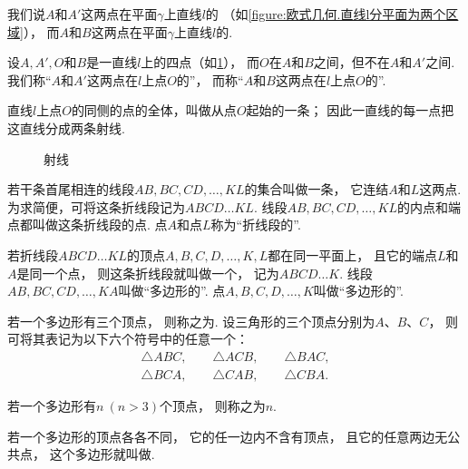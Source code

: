 \begin{definition}
我们说\(A\)和\(A'\)这两点在平面\(\gamma\)上直线\(l\)的
（如\cref{figure:欧式几何.直线l分平面为两个区域}），
而\(A\)和\(B\)这两点在平面\(\gamma\)上直线\(l\)的.
\end{definition}

\begin{definition}
设\(A,A',O\)和\(B\)是一直线\(l\)上的四点（如\cref{figure:欧式几何.射线}），
而\(O\)在\(A\)和\(B\)之间，但不在\(A\)和\(A'\)之间.
我们称“\(A\)和\(A'\)这两点在\(l\)上点\(O\)的”，
而称“\(A\)和\(B\)这两点在\(l\)上点\(O\)的”.

直线\(l\)上点\(O\)的同侧的点的全体，叫做从点\(O\)起始的一条；
因此一直线的每一点把这直线分成两条射线.
\begin{figure}[ht]
\centering
{}
\caption{射线}
\label{figure:欧式几何.射线}
\end{figure}
\end{definition}

\begin{definition}
若干条首尾相连的线段\(AB,BC,CD,\dotsc,KL\)的集合叫做一条，%
它连结\(A\)和\(L\)这两点.
为求简便，可将这条折线段记为\(ABCD \dotso KL\).
线段\(AB,BC,CD,\dotsc,KL\)的内点和端点都叫做这条折线段的点.
点\(A\)和点\(L\)称为“折线段的”.

若折线段\(ABCD \dotso KL\)的顶点\(A,B,C,D,\dotsc,K,L\)都在同一平面上，%
且它的端点\(L\)和\(A\)是同一个点，%
则这条折线段就叫做一个，%
记为\(ABCD \dotso K\).
线段\(AB,BC,CD,\dotsc,KA\)叫做“多边形的”.
点\(A,B,C,D,\dotsc,K\)叫做“多边形的”.

若一个多边形有三个顶点，%
则称之为.
设三角形的三个顶点分别为\(A\)、\(B\)、\(C\)，%
则可将其表记为以下六个符号中的任意一个：
\[
\begin{split}
\triangle ABC, \qquad
\triangle ACB, \qquad
\triangle BAC, \\
\triangle BCA, \qquad
\triangle CAB, \qquad
\triangle CBA.
\end{split}
\]

若一个多边形有\(n\ (n>3)\)个顶点，%
则称之为\(n\).

若一个多边形的顶点各各不同，%
它的任一边内不含有顶点，%
且它的任意两边无公共点，%
这个多边形就叫做.
\end{definition}


